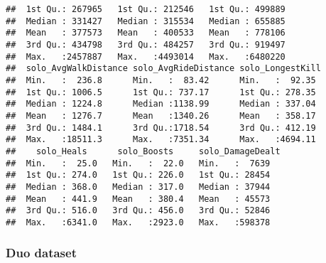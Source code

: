 \documentclass[]{article}
\begin{document}
\begin{verbatim}
##  1st Qu.: 267965   1st Qu.: 212546   1st Qu.: 499889  
##  Median : 331427   Median : 315534   Median : 655885  
##  Mean   : 377573   Mean   : 400533   Mean   : 778106  
##  3rd Qu.: 434798   3rd Qu.: 484257   3rd Qu.: 919497  
##  Max.   :2457887   Max.   :4493014   Max.   :6480220  
##  solo_AvgWalkDistance solo_AvgRideDistance solo_LongestKill 
##  Min.   :  236.8      Min.   :  83.42      Min.   :  92.35  
##  1st Qu.: 1006.5      1st Qu.: 737.17      1st Qu.: 278.35  
##  Median : 1224.8      Median :1138.99      Median : 337.04  
##  Mean   : 1276.7      Mean   :1340.26      Mean   : 358.17  
##  3rd Qu.: 1484.1      3rd Qu.:1718.54      3rd Qu.: 412.19  
##  Max.   :18511.3      Max.   :7351.34      Max.   :4694.11  
##    solo_Heals      solo_Boosts     solo_DamageDealt
##  Min.   :  25.0   Min.   :  22.0   Min.   :  7639  
##  1st Qu.: 274.0   1st Qu.: 226.0   1st Qu.: 28454  
##  Median : 368.0   Median : 317.0   Median : 37944  
##  Mean   : 441.9   Mean   : 380.4   Mean   : 45573  
##  3rd Qu.: 516.0   3rd Qu.: 456.0   3rd Qu.: 52846  
##  Max.   :6341.0   Max.   :2923.0   Max.   :598378
\end{verbatim}

\subsubsection{Duo dataset}\label{duo-dataset}
\end{document}
